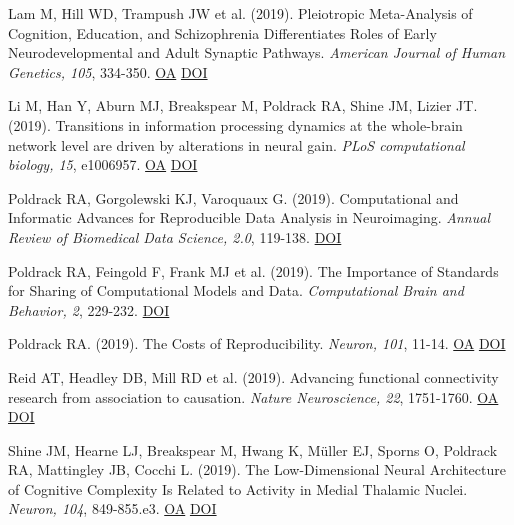 \documentclass[10pt, letterpaper]{article}
\begin{document}
Lam M, Hill WD, Trampush JW et al. (2019). Pleiotropic Meta-Analysis of Cognition, Education, and Schizophrenia Differentiates Roles of Early Neurodevelopmental and Adult Synaptic Pathways. \textit{American Journal of Human Genetics, 105}, 334-350. \href{https://www.ncbi.nlm.nih.gov/pmc/articles/PMC6699140}{OA} \href{https://doi.org/10.1016/j.ajhg.2019.06.012}{DOI} \vspace{2mm}

Li M, Han Y, Aburn MJ, Breakspear M, Poldrack RA, Shine JM, Lizier JT.  (2019). Transitions in information processing dynamics at the whole-brain network level are driven by alterations in neural gain. \textit{PLoS computational biology, 15}, e1006957. \href{https://www.ncbi.nlm.nih.gov/pmc/articles/PMC6793849}{OA} \href{https://doi.org/10.1371/journal.pcbi.1006957}{DOI} \vspace{2mm}

Poldrack RA, Gorgolewski KJ, Varoquaux G.  (2019). Computational and Informatic Advances for Reproducible Data Analysis in Neuroimaging. \textit{Annual Review of Biomedical Data Science, 2.0}, 119-138. \href{https://doi.org/10.1146/annurev-biodatasci-072018-021237}{DOI} \vspace{2mm}

Poldrack RA, Feingold F, Frank MJ et al. (2019). The Importance of Standards for Sharing of Computational Models and Data. \textit{Computational Brain and Behavior, 2}, 229-232. \href{https://doi.org/10.1007/s42113-019-00062-x}{DOI} \vspace{2mm}

Poldrack RA.  (2019). The Costs of Reproducibility. \textit{Neuron, 101}, 11-14. \href{https://doi.org/10.1016/j.neuron.2018.11.030}{OA} \href{https://doi.org/10.1016/j.neuron.2018.11.030}{DOI} \vspace{2mm}

Reid AT, Headley DB, Mill RD et al. (2019). Advancing functional connectivity research from association to causation. \textit{Nature Neuroscience, 22}, 1751-1760. \href{https://www.ncbi.nlm.nih.gov/pmc/articles/PMC7289187}{OA} \href{https://doi.org/10.1038/s41593-019-0510-4}{DOI} \vspace{2mm}

Shine JM, Hearne LJ, Breakspear M, Hwang K, Müller EJ, Sporns O, Poldrack RA, Mattingley JB, Cocchi L.  (2019). The Low-Dimensional Neural Architecture of Cognitive Complexity Is Related to Activity in Medial Thalamic Nuclei. \textit{Neuron, 104}, 849-855.e3. \href{https://doi.org/10.1016/j.neuron.2019.09.002}{OA} \href{https://doi.org/10.1016/j.neuron.2019.09.002}{DOI} \vspace{2mm}
\end{document}

